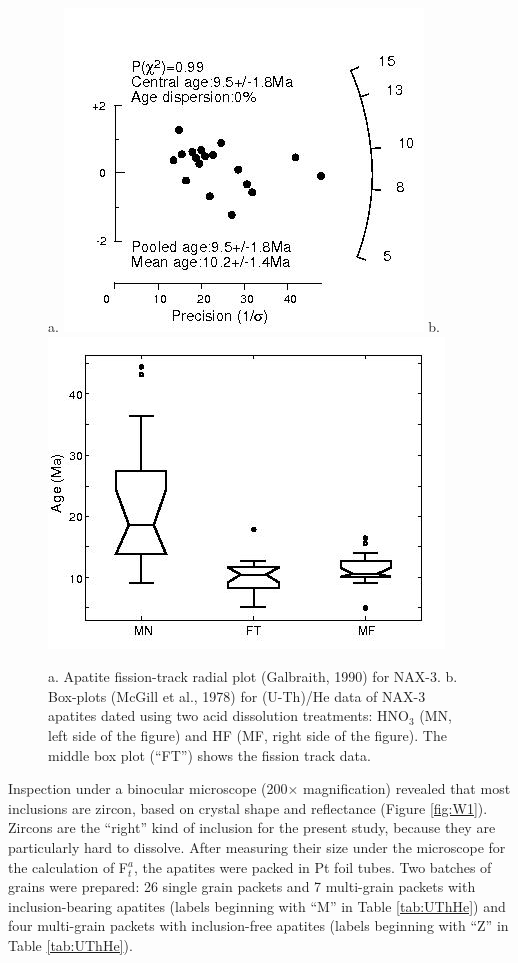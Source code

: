 \documentclass{article}
\begin{document}
\begin{figure}[htbp]
  \centering
a. \includegraphics[width=.45\textwidth]{NAX3radial.jpg}
b. \includegraphics[width=.45\textwidth]{boxplots.jpg}
  \caption{
    a.  Apatite fission-track radial plot (Galbraith, 1990) for NAX-3.
    b.  Box-plots  (McGill et al.,  1978) for (U-Th)/He data  of NAX-3
    apatites dated using two acid dissolution treatments: HNO$_3$ (MN,
    left side  of the figure) and HF  (MF, right side of  the figure). 
    The middle box plot (``FT'') shows the fission track data.}
  \label{fig:NAX3radial}
\end{figure}

Inspection  under a  binocular microscope  (200$\times$ magnification)
revealed that most  inclusions are zircon, based on  crystal shape and
reflectance (Figure  \ref{fig:W1}). Zircons are the  ``right'' kind of
inclusion for the present study, because they are particularly hard to
dissolve.   After measuring their  size under  the microscope  for the
calculation of F$_t^a$, the apatites were packed in Pt foil tubes. Two
batches  of  grains were  prepared:  26  single  grain packets  and  7
multi-grain packets with  inclusion-bearing apatites (labels beginning
with ``M'' in Table \ref{tab:UThHe}) and four multi-grain packets with
inclusion-free  apatites   (labels  beginning  with   ``Z''  in  Table
\ref{tab:UThHe}).
\end{document}
